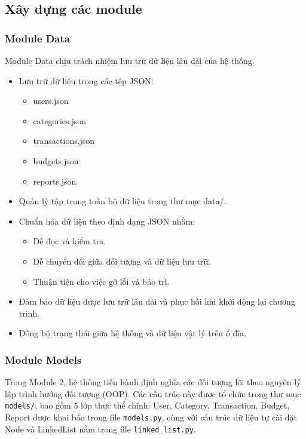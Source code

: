 \documentclass[12pt,letterpaper]{article}
\begin{document}
\subsection{Xây dựng các module}

\subsubsection{Module Data}

Module Data chịu trách nhiệm lưu trữ dữ liệu lâu dài của hệ thống.

\begin{itemize}
\item Lưu trữ dữ liệu trong các tệp JSON:
\begin{itemize}
\item users.json
\item categories.json
\item transactions.json
\item budgets.json
\item reports.json
\end{itemize}
\item Quản lý tập trung toàn bộ dữ liệu trong thư mục data/.

\item Chuẩn hóa dữ liệu theo định dạng JSON nhằm:
\begin{itemize}
    \item Dễ đọc và kiểm tra.
    \item Dễ chuyển đổi giữa đối tượng và dữ liệu lưu trữ.
    \item Thuận tiện cho việc gỡ lỗi và bảo trì.
\end{itemize}

\item Đảm bảo dữ liệu được lưu trữ lâu dài và phục hồi khi khởi động lại chương trình.

\item Đồng bộ trạng thái giữa hệ thống và dữ liệu vật lý trên ổ đĩa.
\end{itemize}

\subsubsection{Module Models}

Trong Module 2, hệ thống tiến hành định nghĩa các đối tượng lõi theo nguyên lý lập trình hướng đối tượng (OOP). 
Các cấu trúc này được tổ chức trong thư mục \texttt{models/}, bao gồm 5 lớp thực thể chính: User, Category, Transaction, Budget, Report
được khai báo trong file \texttt{models.py}, cùng với cấu trúc dữ liệu tự cài đặt Node và LinkedList nằm trong file \texttt{linked\_list.py}.
\end{document}
